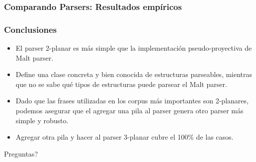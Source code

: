 \documentclass[spanish]{beamer}
\begin{document}
\begin{frame}
\frametitle{Comparando Parsers: Resultados empíricos}
\begin{table}[h]
\caption{Accuracy del parsing para el 2-planar parser (2P) comparado con Malt parser con 
transformaciones pseudo-proyectivas (M). \newline LAS = Labeled Attachment Score \newline UAS = Unlabeled Attachment Score \newline NPP = Precision on Non-Projective arcs \newline NPR = Recall on Non-Projective arcs.}
\end{table}
\end{frame}



\begin{frame}
\frametitle{Conclusiones}
\begin{itemize}[<+->]
\item El parser 2-planar es más simple que la implementación pseudo-proyectiva de Malt parser.
\item Define una clase concreta y bien conocida de estructuras parseables, mientras que no se sabe qué tipos de estructuras puede parsear el Malt parser.
\item Dado que las frases utilizadas en los corpus más importantes son 2-planares, podemos asegurar que el agregar una pila al parser genera otro parser más simple y robusto.
\item Agregar otra pila y hacer al parser 3-planar cubre el 100\% de las casos.
\end{itemize}
\end{frame}


\begin{frame}
Preguntas?
\end{frame}
\end{document}
